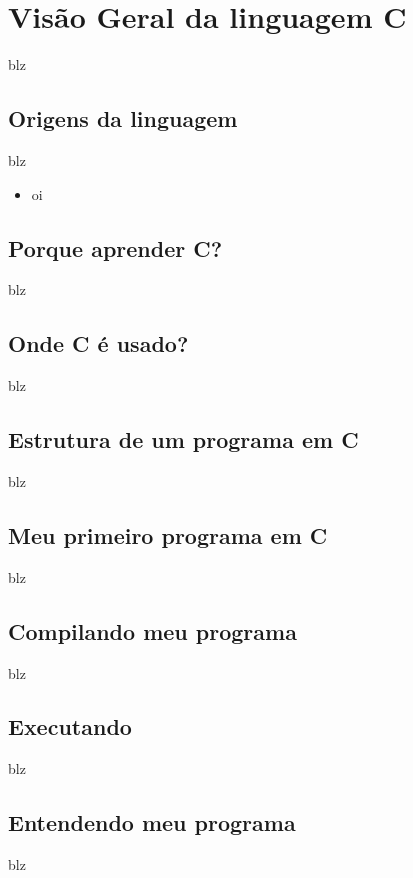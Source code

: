 
\chapter{Visão Geral da linguagem C}
blz


\section{Origens da linguagem}
blz

\begin{itemize}
\item oi
\end{itemize}
\section{Porque aprender C?}
blz

\section{Onde C é usado?}
blz

\section{Estrutura de um programa em C}
blz

\section{Meu primeiro programa em C}
blz

\section{Compilando meu programa}
blz

\section{Executando}
blz

\section{Entendendo meu programa}
blz

